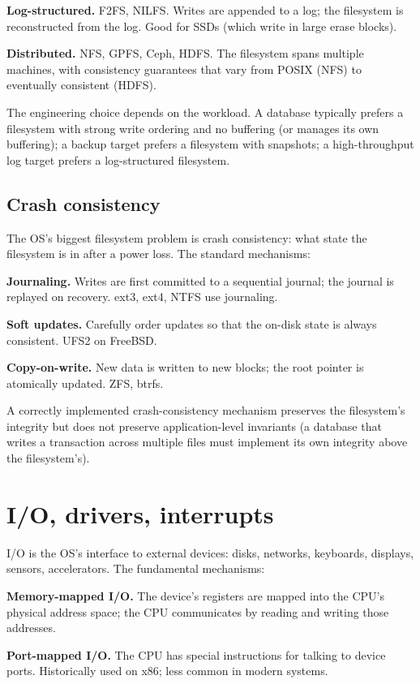 \textbf{Log-structured.} F2FS, NILFS. Writes are appended to a log; the filesystem is reconstructed from the log. Good for SSDs (which write in large erase blocks).

\textbf{Distributed.} NFS, GPFS, Ceph, HDFS. The filesystem spans multiple machines, with consistency guarantees that vary from POSIX (NFS) to eventually consistent (HDFS).

The engineering choice depends on the workload. A database typically prefers a filesystem with strong write ordering and no buffering (or manages its own buffering); a backup target prefers a filesystem with snapshots; a high-throughput log target prefers a log-structured filesystem.

\subsection{Crash consistency}

The OS's biggest filesystem problem is crash consistency: what state the filesystem is in after a power loss. The standard mechanisms:

\textbf{Journaling.} Writes are first committed to a sequential journal; the journal is replayed on recovery. ext3, ext4, NTFS use journaling.

\textbf{Soft updates.} Carefully order updates so that the on-disk state is always consistent. UFS2 on FreeBSD.

\textbf{Copy-on-write.} New data is written to new blocks; the root pointer is atomically updated. ZFS, btrfs.

A correctly implemented crash-consistency mechanism preserves the filesystem's integrity but does not preserve application-level invariants (a database that writes a transaction across multiple files must implement its own integrity above the filesystem's).

\section{I/O, drivers, interrupts}

I/O is the OS's interface to external devices: disks, networks, keyboards, displays, sensors, accelerators. The fundamental mechanisms:

\textbf{Memory-mapped I/O.} The device's registers are mapped into the CPU's physical address space; the CPU communicates by reading and writing those addresses.

\textbf{Port-mapped I/O.} The CPU has special instructions for talking to device ports. Historically used on x86; less common in modern systems.


